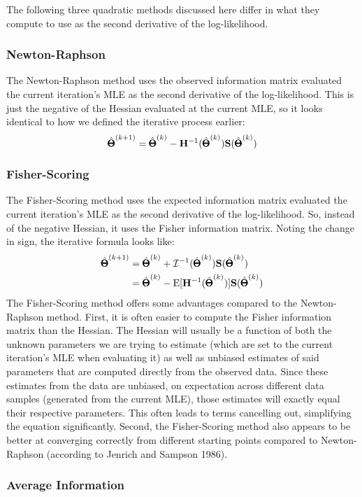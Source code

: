 \documentclass[12pt]{article}
\begin{document}
The following three quadratic methods discussed here differ in what they compute to use as the second derivative of the log-likelihood.

\subsubsection{Newton-Raphson}
The Newton-Raphson method uses the observed information matrix evaluated the current iteration's MLE as the second derivative of the log-likelihood.
This is just the negative of the Hessian evaluated at the current MLE, so it looks identical to how we defined the iterative process earlier:
$$
\hat{\pmb{\Theta}}^{(k+1)} = 
\hat{\pmb{\Theta}}^{(k)} -
\mathbf{H}^{-1} (\hat{\pmb{\Theta}}^{(k)})
\mathbf{S}(\hat{\pmb{\Theta}}^{(k)})
$$

\subsubsection{Fisher-Scoring}
The Fisher-Scoring method uses the expected information matrix evaluated the current iteration's MLE as the second derivative of the log-likelihood.
So, instead of the negative Hessian, it uses the Fisher information matrix.
Noting the change in sign, the iterative formula looks like:
\begin{align*}
\hat{\pmb{\Theta}}^{(k+1)} &= 
\hat{\pmb{\Theta}}^{(k)} +
\mathcal{I}^{-1} (\hat{\pmb{\Theta}}^{(k)})
\mathbf{S}(\hat{\pmb{\Theta}}^{(k)}) \\
&= 
\hat{\pmb{\Theta}}^{(k)} -
\mathrm{E}[\mathbf{H}^{-1} (\hat{\pmb{\Theta}}^{(k)})]
\mathbf{S}(\hat{\pmb{\Theta}}^{(k)})
\end{align*}
The Fisher-Scoring method offers some advantages compared to the Newton-Raphson method.
First, it is often easier to compute the Fisher information matrix than the Hessian.
The Hessian will usually be a function of both the unknown parameters we are trying to estimate (which are set to the current iteration's MLE when evaluating it) as well as unbiased estimates of said parameters that are computed directly from the observed data.
Since these estimates from the data are unbiased, on expectation across different data samples (generated from the current MLE), those estimates will exactly equal their respective parameters.
This often leads to terms cancelling out, simplifying the equation significantly.
Second, the Fisher-Scoring method also appears to be better at converging correctly from different starting points compared to Newton-Raphson (according to Jenrich and Sampson 1986).

\subsubsection{Average Information}
\end{document}
